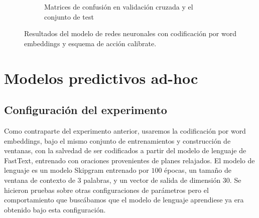 \begin{figure}
\begin{subfigure}[b]{\textwidth}
    \endminipage
    \caption{Matrices de confusión en validación cruzada y el conjunto de test}
    \end{subfigure}
    \caption{Resultados del modelo de redes neuronales con codificación por word embeddings y esquema de acción calibrate.}
\end{figure}

\begin{table}[h!]
\centering
{}
 \caption{Resultados por esquema de acción del mejor modelo con codificación por word embeddings.}
 \label{results:ad-hoc-calibrate}
\end{table}


\section{Modelos predictivos ad-hoc}
\label{exp:wb}

\subsection{Configuración del experimento}

Como contraparte del experimento anterior, usaremos la codificación por word
embeddings, bajo el mismo conjunto de entrenamientos y construcción de ventanas,
con la salvedad de ser codificados a partir del modelo de lenguaje de FastText,
entrenado con oraciones provenientes de planes relajados. El modelo de lenguaje
es un modelo Skipgram entrenado por $100$ épocas, un tamaño de ventana de
contexto de $3$ palabras, y un vector de salida de dimensión $30$. Se hicieron
pruebas sobre otras configuraciones de parámetros pero el comportamiento que
buscábamos que el modelo de lenguaje aprendiese ya era obtenido bajo esta
configuración.


